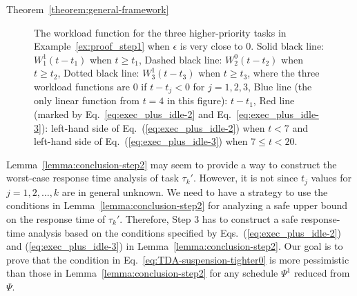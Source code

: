 \begin{appProof}{Theorem~\ref{theorem:general-framework}}
\begin{figure}[t]
  \caption{\small The workload function for the three higher-priority tasks in Example~\ref{ex:proof_step1} when $\epsilon$ is very close to $0$. Solid black line: $W_1^1(t-t_1)$ when $t \geq t_1$, Dashed black line: $W_2^0(t-t_2)$ when $t \geq t_2$, Dotted black line: $W_3^1(t-t_3)$ when $t \geq t_3$, where the three workload functions are $0$ if $t-t_j < 0$ for $j=1,2,3$, Blue line (the only linear function from $t=4$ in this figure): $t-t_1$, Red line (marked by Eq.~\eqref{eq:exec_plus_idle-2} and Eq.~\eqref{eq:exec_plus_idle-3}): left-hand side of Eq.~(\ref{eq:exec_plus_idle-2}) when $t < 7$ and left-hand side of Eq.~(\ref{eq:exec_plus_idle-3}) when $ 7 \leq t < 20$.}
  \label{fig:example-step2}
\end{figure}



Lemma~\ref{lemma:conclusion-step2} may seem to provide a way to
construct the worst-case response time analysis of task
$\tau_k'$. However, it is not since $t_j$ values for $j=1,2,\ldots,k$
are in general unknown. We need to have a strategy to use the
conditions in Lemma~\ref{lemma:conclusion-step2} for analyzing a safe upper bound on the response time of $\tau_k'$.
Therefore, Step 3 has to construct a safe response-time analysis based on the
conditions specified by Eqs.~(\ref{eq:exec_plus_idle-2}) and
(\ref{eq:exec_plus_idle-3}) in Lemma~\ref{lemma:conclusion-step2}. Our
goal is to prove that the condition in
Eq.~\eqref{eq:TDA-suspension-tighter0} is more pessimistic than those
in Lemma~\ref{lemma:conclusion-step2} for any schedule $\Psi^1$ reduced from $\Psi$.


\end{appProof}
